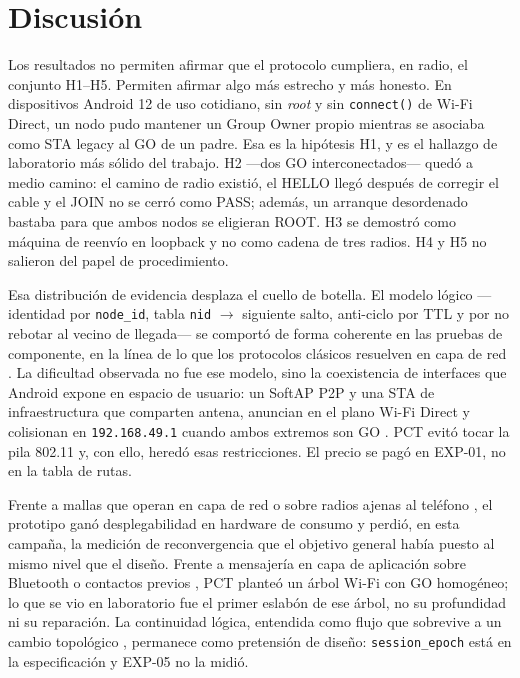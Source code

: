 \documentclass[12pt,oneside]{scrreprt}
\begin{document}
\section{Discusión}

Los resultados no permiten afirmar que el protocolo cumpliera, en radio, el conjunto H1--H5. Permiten afirmar algo más estrecho y más honesto. En dispositivos Android 12 de uso cotidiano, sin \emph{root} y sin \texttt{connect()} de Wi-Fi Direct, un nodo pudo mantener un Group Owner propio mientras se asociaba como STA legacy al GO de un padre. Esa es la hipótesis H1, y es el hallazgo de laboratorio más sólido del trabajo. H2 ---dos GO interconectados--- quedó a medio camino: el camino de radio existió, el HELLO llegó después de corregir el cable y el JOIN no se cerró como PASS; además, un arranque desordenado bastaba para que ambos nodos se eligieran ROOT. H3 se demostró como máquina de reenvío en loopback y no como cadena de tres radios. H4 y H5 no salieron del papel de procedimiento.

Esa distribución de evidencia desplaza el cuello de botella. El modelo lógico ---identidad por \texttt{node\_id}, tabla \texttt{nid} $\rightarrow$ siguiente salto, anti-ciclo por TTL y por no rebotar al vecino de llegada--- se comportó de forma coherente en las pruebas de componente, en la línea de lo que los protocolos clásicos resuelven en capa de red \parencite{Perkins2003,Clausen2003}. La dificultad observada no fue ese modelo, sino la coexistencia de interfaces que Android expone en espacio de usuario: un SoftAP P2P y una STA de infraestructura que comparten antena, anuncian en el plano Wi-Fi Direct y colisionan en \texttt{192.168.49.1} cuando ambos extremos son GO \parencite{WiFiAlliance2010,AndroidDevelopers2024}. PCT evitó tocar la pila 802.11 \parencite{IEEE2020} y, con ello, heredó esas restricciones. El precio se pagó en EXP-01, no en la tabla de rutas.

Frente a mallas que operan en capa de red o sobre radios ajenas al teléfono \parencite{Akyildiz2005,MeshtasticProject2023}, el prototipo ganó desplegabilidad en hardware de consumo y perdió, en esta campaña, la medición de reconvergencia que el objetivo general había puesto al mismo nivel que el diseño. Frente a mensajería en capa de aplicación sobre Bluetooth o contactos previos \parencite{BriarProject2021,Biagioni2025}, PCT planteó un árbol Wi-Fi con GO homogéneo; lo que se vio en laboratorio fue el primer eslabón de ese árbol, no su profundidad ni su reparación. La continuidad lógica, entendida como flujo que sobrevive a un cambio topológico \parencite{Karl2005}, permanece como pretensión de diseño: \texttt{session\_epoch} está en la especificación y EXP-05 no la midió.
\end{document}
